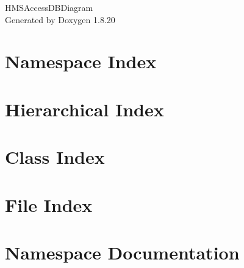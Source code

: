 \let\mypdfximage\pdfximage\def\pdfximage{\immediate\mypdfximage}\documentclass[twoside]{book}
\newcommand{\+}{\discretionary{\mbox{\scriptsize$\hookleftarrow$}}{}{}}
\newcommand{\clearemptydoublepage}{%
  \newpage{\pagestyle{empty}\cleardoublepage}%
}
\begin{document}
\hypersetup{pageanchor=false,
             bookmarksnumbered=true,
             pdfencoding=unicode
            }
\begin{titlepage}
\vspace*{7cm}
\begin{center}%
{\Large H\+M\+S\+Access\+D\+B\+Diagram }\\
\vspace*{1cm}
{\large Generated by Doxygen 1.8.20}\\
\end{center}
\end{titlepage}
\clearemptydoublepage
{}
\tableofcontents
\clearemptydoublepage
{}
\hypersetup{pageanchor=true}

\chapter{Namespace Index}

\chapter{Hierarchical Index}

\chapter{Class Index}

\chapter{File Index}

\chapter{Namespace Documentation}












\end{document}
